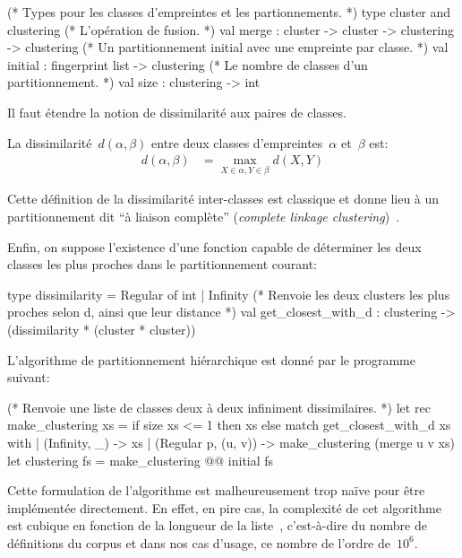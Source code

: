 \begin{ocaml}
(* Types pour les classes d'empreintes et les partionnements. *)
type cluster and clustering
(* L'opération de fusion. *)
val merge : cluster -> cluster -> clustering -> clustering
(* Un partitionnement initial avec une empreinte par classe. *)
val initial : fingerprint list -> clustering
(* Le nombre de classes d'un partitionnement. *)
val size : clustering -> int
\end{ocaml}

Il faut étendre la notion de dissimilarité aux paires de classes.

\begin{defn}
La dissimilarité~$d(\alpha, \beta)$ entre deux classes
d'empreintes~$\alpha$ et~$\beta$ est:
\begin{align*}
d(\alpha,\beta) &= \max\limits_{X \in \alpha, Y \in \beta} d(X,Y)
\end{align*}
\end{defn}

Cette définition de la dissimilarité inter-classes est classique et
donne lieu à un partitionnement dit ``à liaison complète'' (\emph{complete
  linkage clustering})~\cite{DBLP:books/crc/aggarwal13/ReddyV13}.

Enfin, on suppose l'existence d'une fonction capable de déterminer
les deux classes les plus proches dans le partitionnement courant:

\begin{ocaml}
type dissimilarity = Regular of int | Infinity
(* Renvoie les deux clusters les plus proches selon d, ainsi que leur distance *)
val get_closest_with_d : clustering -> (dissimilarity * (cluster * cluster))
\end{ocaml}

L'algorithme de partitionnement hiérarchique est donné par le programme {\OCaml} suivant:

\begin{ocaml}
(* Renvoie une liste de classes deux à deux infiniment dissimilaires. *)
let rec make_clustering xs =
  if size xs <= 1 then xs else match get_closest_with_d xs with
   | (Infinity, _) -> xs
   | (Regular p, (u, v)) -> make_clustering (merge u v xs)
let clustering fs = make_clustering @@ initial fs
\end{ocaml}

Cette formulation de l'algorithme est malheureusement trop naïve pour
être implémentée directement. En effet, en pire cas, la complexité de
cet algorithme est cubique en fonction de la longueur de la
liste~, c'est-à-dire du nombre de définitions du
corpus et dans nos cas d'usage, ce nombre de l'ordre de~$10^6$.


